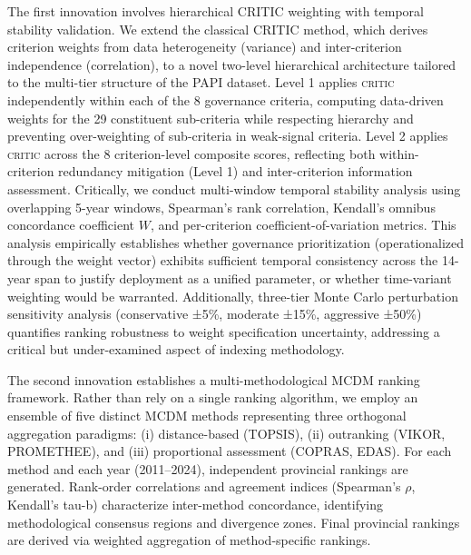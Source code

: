 \documentclass[12pt,a4paper]{article}
\newcommand{\CRITIC}{\textsc{critic}\xspace}
\begin{document}
The first innovation involves hierarchical CRITIC weighting with temporal stability validation. We extend the classical CRITIC method, which derives criterion weights from data heterogeneity (variance) and inter-criterion independence (correlation), to a novel two-level hierarchical architecture tailored to the multi-tier structure of the PAPI dataset. Level 1 applies \CRITIC independently within each of the 8 governance criteria, computing data-driven weights for the 29 constituent sub-criteria while respecting hierarchy and preventing over-weighting of sub-criteria in weak-signal criteria. Level 2 applies \CRITIC across the 8 criterion-level composite scores, reflecting both within-criterion redundancy mitigation (Level 1) and inter-criterion information assessment. Critically, we conduct multi-window temporal stability analysis using overlapping 5-year windows, Spearman's rank correlation, Kendall's omnibus concordance coefficient $W$, and per-criterion coefficient-of-variation metrics. This analysis empirically establishes whether governance prioritization (operationalized through the weight vector) exhibits sufficient temporal consistency across the 14-year span to justify deployment as a unified parameter, or whether time-variant weighting would be warranted. Additionally, three-tier Monte Carlo perturbation sensitivity analysis (conservative ±5\%, moderate ±15\%, aggressive ±50\%) quantifies ranking robustness to weight specification uncertainty, addressing a critical but under-examined aspect of indexing methodology.

The second innovation establishes a multi-methodological MCDM ranking framework. Rather than rely on a single ranking algorithm, we employ an ensemble of five distinct MCDM methods representing three orthogonal aggregation paradigms: (i) distance-based (TOPSIS), (ii) outranking (VIKOR, PROMETHEE), and (iii) proportional assessment (COPRAS, EDAS). For each method and each year (2011--2024), independent provincial rankings are generated. Rank-order correlations and agreement indices (Spearman's $\rho$, Kendall's tau-b) characterize inter-method concordance, identifying methodological consensus regions and divergence zones. Final provincial rankings are derived via weighted aggregation of method-specific rankings.
\end{document}
